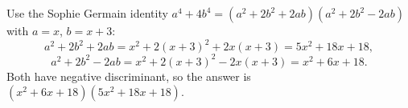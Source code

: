 Use the Sophie Germain identity $a^4+4b^4=(a^2+2b^2+2ab)(a^2+2b^2-2ab)$ with $a=x$, $b=x+3$:
\[a^2+2b^2+2ab=x^2+2(x+3)^2+2x(x+3)=5x^2+18x+18,\]
\[a^2+2b^2-2ab=x^2+2(x+3)^2-2x(x+3)=x^2+6x+18.\]
Both have negative discriminant, so the answer is $\boxed{(x^2+6x+18)(5x^2+18x+18)}$.
